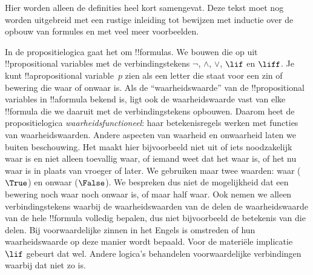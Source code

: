 \documentclass[openany]{memoir}
\begin{document}

\begin{editorial}
  Hier worden alleen de definities heel kort samengevat. Deze tekst moet
  nog worden uitgebreid met een rustige inleiding tot bewijzen met
  inductie over de opbouw van formules en met veel meer voorbeelden.
\end{editorial}
\endgroup

\begingroup
\def\olfilename{OLP-0057}
\def\olfilepath{content/propositional-logic/syntax-and-semantics/}
\hypertarget{unit-OLP-0057}{}





In de propositielogica gaat het om !!{formula}s. We bouwen die op uit
!!{propositional variable}s met de verbindingstekens $\lnot$, $\land$,
$\lor$, $\lif$ en $\liff$. Je kunt !!a{propositional variable}~$p$
zien als een letter die staat voor een zin of bewering die waar of
onwaar is. Als de ``waarheidswaarde'' van de !!{propositional
variable}s in !!a{formula} bekend is, ligt ook de waarheidswaarde vast
van elke !!{formula} die we daaruit met de verbindingstekens opbouwen.
Daarom heet de propositielogica \emph{waarheidsfunctioneel}: haar
betekenisregels werken met functies van waarheidswaarden. Andere
aspecten van waarheid en onwaarheid laten we buiten beschouwing. Het
maakt hier bijvoorbeeld niet uit of iets noodzakelijk waar is en niet
alleen toevallig waar, of iemand weet dat het waar is, of het nu waar
is in plaats van vroeger of later. We gebruiken maar twee waarden:
waar ($\True$) en onwaar ($\False$). We bespreken dus niet de
mogelijkheid dat een bewering noch waar noch onwaar is, of maar half
waar. Ook nemen we alleen verbindingstekens waarbij de
waarheidswaarden van de delen de waarheidswaarde van de hele
!!{formula} volledig bepalen, dus niet bijvoorbeeld de betekenis van
die delen. Bij voorwaardelijke zinnen in het Engels is omstreden
of hun waarheidswaarde op deze manier wordt bepaald. Voor de materiële
implicatie~$\lif$ gebeurt dat wel. Andere logica's behandelen
voorwaardelijke verbindingen waarbij dat niet zo is.
\end{document}
